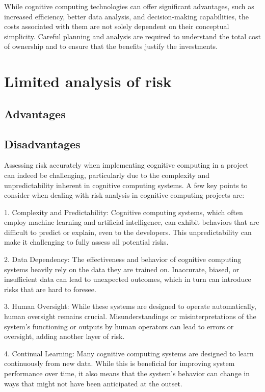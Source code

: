 \documentclass{article}
\begin{document}
While cognitive computing technologies can offer significant advantages, such as increased efficiency, better data analysis, and decision-making capabilities, the costs associated with them are not solely dependent on their conceptual simplicity. Careful planning and analysis are required to understand the total cost of ownership and to ensure that the benefits justify the investments.



\section{Limited analysis of risk}
\subsection{Advantages}

\subsection{Disadvantages}
Assessing risk accurately when implementing cognitive computing in a project can indeed be challenging, particularly due to the complexity and unpredictability inherent in cognitive computing systems. A few key points to consider when dealing with risk analysis in cognitive computing projects are:

1. Complexity and Predictability: Cognitive computing systems, which often employ machine learning and artificial intelligence, can exhibit behaviors that are difficult to predict or explain, even to the developers. This unpredictability can make it challenging to fully assess all potential risks.

2. Data Dependency: The effectiveness and behavior of cognitive computing systems heavily rely on the data they are trained on. Inaccurate, biased, or insufficient data can lead to unexpected outcomes, which in turn can introduce risks that are hard to foresee.

3. Human Oversight: While these systems are designed to operate automatically, human oversight remains crucial. Misunderstandings or misinterpretations of the system's functioning or outputs by human operators can lead to errors or oversight, adding another layer of risk.

4. Continual Learning: Many cognitive computing systems are designed to learn continuously from new data. While this is beneficial for improving system performance over time, it also means that the system's behavior can change in ways that might not have been anticipated at the outset.
\end{document}
